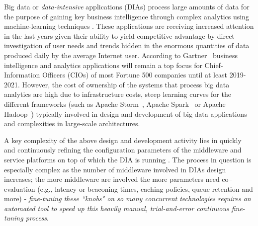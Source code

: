 \documentclass[smallextended]{svjour3}       %
\newcommand{\todoMB}[2]{\linespread{0.7}\todo[color=yellow!50,#1]{\scriptsize\textbf{MB:}#2}}
\begin{document}
Big data or \emph{data-intensive} applications (DIAs) process large amounts of data for the purpose of gaining key business intelligence through complex analytics using machine-learning techniques \cite{bdsurvey,ml4bd}. These applications are receiving increased attention in the last years given their ability to yield competitive advantage by direct investigation of user needs and trends hidden in the enormous quantities of data produced daily by the average Internet user. According to Gartner~\cite{gartner} %
business intelligence and analytics applications will remain a top focus for Chief-Information Officers (CIOs) of most Fortune 500 companies until at least 2019-2021.
However, the cost of ownership of the systems that process big data analytics are high due to infrastructure costs, steep learning curves for the different frameworks (such as Apache Storm~\cite{storm},
Apache Spark~\cite{spark}
or Apache Hadoop~\cite{hadoop}) typically involved in design and development of big data applications
and complexities in large-scale architectures. %

A key complexity of the above design and development activity lies in quickly and continuously refining the configuration parameters of the middleware and service platforms on top of which the DIA is running \cite{wicsabd}. The process in question is especially complex as the number of middleware involved in DIAs design increases; the more middleware are involved the more parameters need co--evaluation (e.g., latency or beaconing times, caching policies, queue retention and more) - \emph{fine-tuning these ``knobs" on so many concurrent technologies requires an automated tool to speed up this heavily manual, trial-and-error continuous fine-tuning process}.
\end{document}
